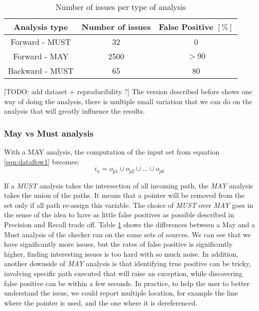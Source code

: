 \begin{table}[h]
	\centering
	\caption{Number of issues per type of analysis}
	\label{table:issue_per_analysis_type}
	\begin{tabular}{|c|c|c|}
		\hline
		\bf Analysis type &  \bf Number of issues &  \bf False Positive $[\%]$ \\ \hline
		Forward - MUST &  32 &  0 \\ 
		Forward - MAY &  2500 & $> 90$  \\ 
		Backward - MUST &  65 & 80 \\ \hline
	\end{tabular}
\end{table}

[TODO: add dataset + reproducibility ?] \newline
The version described before shows one way of doing the analysis, there is multiple small variation that we can do on the analysis that will greatly influence the results.

\subsubsection{May vs Must analysis}
\label{subsubsec:may_vs_must}

With a MAY analysis, the computation of the input set from equation \ref{eqn:dataflow1} becomes:
\begin{equation}\label{eqn:mayvsmust}
i_{n} = o_{p1}  \cup   o_{p2}  \cup  ... \cup   o_{pk}
\end{equation}

If a \emph{MUST} analysis takes the intersection of all incoming path, the \emph{MAY} analysis takes the union of the paths. It means that a pointer will be removed from the set only if all path re-assign this variable.
The choice of \emph{MUST} over \emph{MAY} goes in the sense of the idea to have as little false positives as possible described in Precision and Recall trade off.
Table \ref{table:issue_per_analysis_type} shows the differences between a May and a Must analysis of the checker ran on the same sets of sources.
We can see that we have significantly more issues, but the rates of false positive is significantly higher, finding interesting issues is too hard with so much noise. 
In addition, another downside of \emph{MAY} analysis is that identifying true positive can be tricky, involving specific path executed that will raise an exception, while discovering false positive can be within a few seconds. 
In practice, to help the user to better understand the issue, we could report multiple location, for example the line where the pointer is used, and the one where it is dereferenced. 

